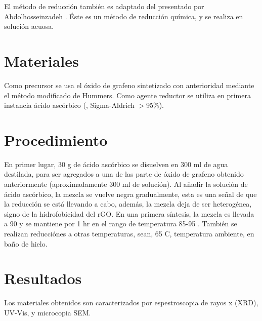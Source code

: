 El método de reducción también es adaptado del presentado por Abdolhosseinzadeh \citep{Abdolhosseinzadeh2015}. Éste es un método de reducción química, y se realiza en solución acuosa.

\section{Materiales}
Como precursor se usa el óxido de grafeno sintetizado con anterioridad mediante el método modificado de Hummers. Como agente reductor se utiliza en primera instancia ácido ascórbico (, Sigma-Aldrich $>$95\%).

\section{Procedimiento}
En primer lugar, 30 g de ácido ascórbico se disuelven en 300 ml de agua destilada, para ser agregados a una de las parte de óxido de grafeno obtenido anteriormente (aproximadamente 300 ml de solución). Al añadir la solución de ácido ascórbico, la mezcla se vuelve negra gradualmente, esta es una señal de que la reducción se está llevando a cabo, además, la mezcla deja de ser heterogénea, signo de la hidrofobicidad del rGO. En una primera síntesis, la mezcla es llevada a 90 \degrees y se mantiene por 1 hr en el rango de temperatura 85-95 \degrees. También se realizan reducciónes a otras temperaturas, sean, 65 \degrees C, temperatura ambiente, en baño de hielo.

\section{Resultados}
Los materiales obtenidos son caracterizados por espestroscopia de rayos x (XRD), UV-Vis, y microcopia SEM.

